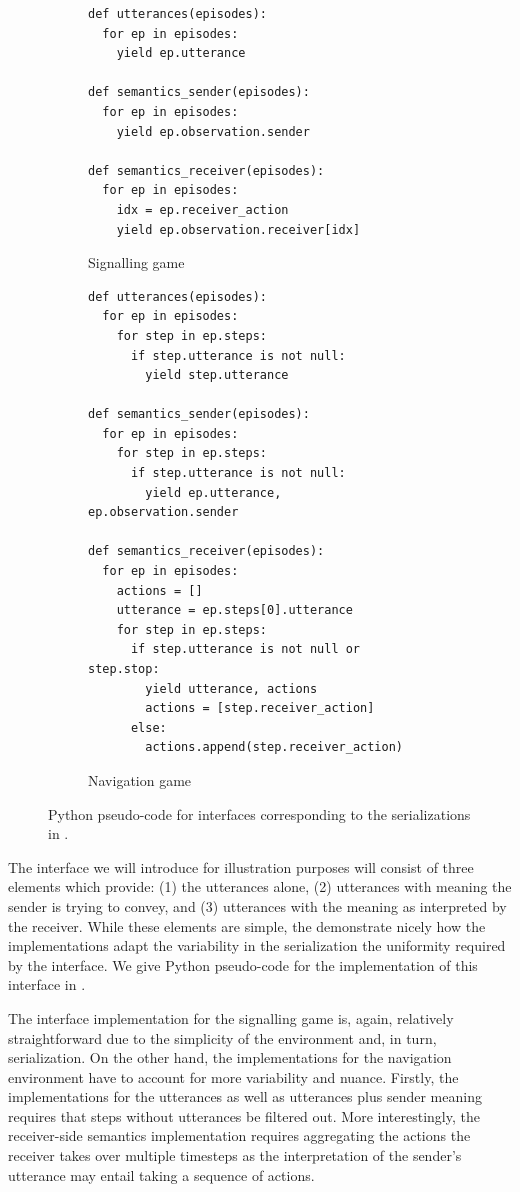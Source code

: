 \begin{figure}
  \centering
  \begin{subfigure}[t]{0.4\linewidth}
    \centering
    \footnotesize
\begin{verbatim}
def utterances(episodes):
  for ep in episodes:
    yield ep.utterance

def semantics_sender(episodes):
  for ep in episodes:
    yield ep.observation.sender

def semantics_receiver(episodes):
  for ep in episodes:
    idx = ep.receiver_action
    yield ep.observation.receiver[idx]
\end{verbatim}
    \caption{Signalling game}
  \end{subfigure}
  \hfill
  \begin{subfigure}[t]{0.55\linewidth}
    \centering
    \footnotesize
\begin{verbatim}
def utterances(episodes):
  for ep in episodes:
    for step in ep.steps:
      if step.utterance is not null:
        yield step.utterance

def semantics_sender(episodes):
  for ep in episodes:
    for step in ep.steps:
      if step.utterance is not null:
        yield ep.utterance, ep.observation.sender

def semantics_receiver(episodes):
  for ep in episodes:
    actions = []
    utterance = ep.steps[0].utterance
    for step in ep.steps:
      if step.utterance is not null or step.stop:
        yield utterance, actions
        actions = [step.receiver_action]
      else:
        actions.append(step.receiver_action)
\end{verbatim}
    \caption{Navigation game}
  \end{subfigure}
  \caption{Python pseudo-code for interfaces corresponding to the serializations in .}
  \unskip\label{fig:interface}
\end{figure}

The interface we will introduce for illustration purposes will consist of three elements which provide:
  (1) the utterances alone,
  (2) utterances with meaning the sender is trying to convey,
  and (3) utterances with the meaning as interpreted by the receiver.
While these elements are simple, the demonstrate nicely how the implementations adapt the variability in the serialization the uniformity required by the interface.
We give Python pseudo-code for the implementation of this interface in .

The interface implementation for the signalling game is, again, relatively straightforward due to the simplicity of the environment and, in turn, serialization.
On the other hand, the implementations for the navigation environment have to account for more variability and nuance.
Firstly, the implementations for the utterances as well as utterances plus sender meaning requires that steps without utterances be filtered out.
More interestingly, the receiver-side semantics implementation requires aggregating the actions the receiver takes over multiple timesteps as the interpretation of the sender's utterance may entail taking a sequence of actions.

